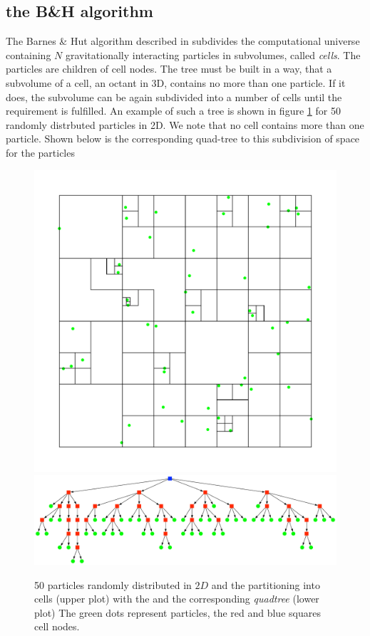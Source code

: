 \subsection{the B\&H algorithm}
The Barnes \& Hut algorithm described in \cite{1986Natur.324..446B} subdivides the computational universe containing $N$ gravitationally interacting particles in subvolumes, called \emph{cells}. The particles are children of cell nodes. The tree must be built in a way, that a subvolume of a cell, an octant in 3D, contains no more than one particle. If it does, the subvolume can be again subdivided into a number of cells until the requirement is fulfilled. An example of such a tree is shown in figure \ref{fig:2D_BHtree} for 50 randomly distrbuted particles in 2D. We note that no cell contains more than one particle. Shown below is the corresponding quad-tree to this subdivision of space for the particles
\begin{figure}[htbp]
\begin{center}
\includegraphics[scale=0.6]{quadtree50_xy.pdf}
\includegraphics[scale=0.3]{quadtree50.pdf}
\caption{50 particles randomly distributed in $2D$ and the partitioning into cells (upper plot) with the and the corresponding \emph{quadtree} (lower plot) The green dots represent particles, the red and blue squares cell nodes.}
\label{fig:2D_BHtree}
\end{center}
\end{figure}\\

